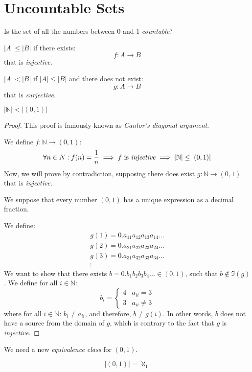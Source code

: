 \documentclass[00_complete]{subfiles}
\begin{document}
\section{Uncountable Sets}
Is the set of all the numbers between $0$ and $1$ \emph{countable}?
\begin{definition}
    $|A|\leq|B|$ if there exists:
    $$f:A \to B$$
    that is \emph{injective}.
\end{definition}
\begin{definition}
    $|A|<|B|$ if $|A|\leq|B|$ and there does not exist:
    $$g: A \to B$$
    that is \emph{surjective}.
\end{definition}
\begin{claim}
    $|\mathbb{N}|<|(0,1)|$
\end{claim}
\begin{proof}
    This proof is famously known as \emph{Cantor's diagonal argument}.

    We define $f: \mathbb{N} \to (0,1)$:
    $$\forall n \in N: f(n)=\frac{1}{n}\implies f \text{ is
    \emph{injective}}\implies |\mathbb{N}|\leq|(0,1)|$$
    Now, we will prove by contradiction, supposing there does exist $g:
    \mathbb{N} \to (0,1)$ that is \emph{injective}.

    We suppose that every number $(0,1)$ has a unique expression as a
    decimal fraction.

    We define:
    \begin{gather*}
        g(1)=0.a_{11}a_{12}a_{13}a_{14}\dots \\
        g(2)=0.a_{21}a_{22}a_{23}a_{24}\dots \\
        g(3)=0.a_{31}a_{32}a_{33}a_{34}\dots \\
        \vdots
    \end{gather*}
    We want to show that there exists $b=0.b_1b_2b_3b_4\dots \in (0,1)$, such
    that $b \notin \Im (g)$. We define for all $i \in \mathbb{N}$:
    $$b_i=\begin{cases}
        4 & a_{ii}=3 \\
        3 & a_{ii}\neq 3
    \end{cases}$$
    where for all $i \in \mathbb{N}$: $b_i \neq a_{ii}$, and therefore, $b\neq
    g(i)$. In other words, $b$ does not have a source from the domain of $g$,
    which is contrary to the fact that $g$ is \emph{injective}.
\end{proof}
We need a new \emph{equivalence class} for $(0,1)$.
\begin{symbols}
    $$|(0,1)|=\aleph_1$$
\end{symbols}
\end{document}
